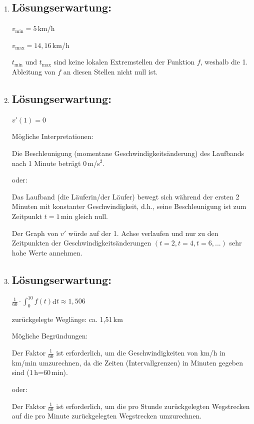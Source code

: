 \begin{langesbeispiel}
{\begin{enumerate}
zurückgelegte Weglänge: $0,5\,\text{h}\cdot 11,57\,\text{km/h}=5,785$\,km

	\item \subsection{Lösungserwartung:}
	
	$v_\text{min}=5$\,km/h
	
	$v_\text{max}=14,16$\,km/h\leer
	
	$t_\text{min}$ und $t_\text{max}$ sind keine lokalen Extremstellen der Funktion $f$, weshalb die 1. Ableitung von $f$ an diesen Stellen nicht null ist.

\item \subsection{Lösungserwartung:}
	
$v'(1)=0$

Mögliche Interpretationen:

Die Beschleunigung (momentane Geschwindigkeitsänderung) des Laufbands nach 1 Minute beträgt 0\,m/s$^2$.

oder:

Das Laufband (die Läuferin/der Läufer) bewegt sich während der ersten 2 Minuten mit konstanter Geschwindigkeit, d.h., seine Beschleunigung ist zum Zeitpunkt $t=1$\,min gleich null.\leer

Der Graph von $v'$ würde auf der 1. Achse verlaufen und nur zu den Zeitpunkten der Geschwindigkeitsänderungen $(t=2, t=4, t=6,...)$ sehr hohe Werte annehmen.

\item \subsection{Lösungserwartung:}
	
$\frac{1}{60}\cdot\int^{10}_0{f(t)}$d$t\approx 1,506$

zurückgelegte Weglänge: ca. 1,51\,km\leer

Mögliche Begründungen:

Der Faktor $\frac{1}{60}$ ist erforderlich, um die Geschwindigkeiten von km/h in km/min umzurechnen, da die Zeiten (Intervallgrenzen) in Minuten gegeben sind (1\,h=60\,min).

oder:

Der Faktor $\frac{1}{60}$ ist erforderlich, um die pro Stunde zurückgelegten Wegstrecken auf die pro Minute zurückgelegten Wegstrecken umzurechnen.\leer


\end{enumerate}}
\end{langesbeispiel}
